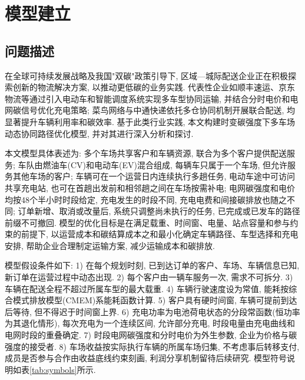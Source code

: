 \documentclass{setp-new}
\begin{document}

\section{模型建立}

\subsection{问题描述}

在全球可持续发展战略及我国"双碳"政策引导下,
区域—城际配送企业正在积极探索创新的物流解决方案, 以推动更低碳的业务实践.
代表性企业如顺丰速运、京东物流等通过引入电动车和智能调度系统实现多车型协同运输,
并结合分时电价和电网碳信号优化充电策略;
菜鸟网络与中通快递依托多仓协同机制开展联合配送, 均显著提升车辆利用率和碳效率.
基于此类行业实践, 本文构建时变碳强度下多车场动态协同路径优化模型, 并对其进行深入分析和探讨.

本文模型具体表述为:
多个车场共享客户和车辆资源, 联合为多个客户提供配送服务;
车队由燃油车(CV)和电动车(EV)混合组成, 每辆车只属于一个车场, 但允许服务其他车场的客户;
车辆可在一个运营日内连续执行多趟任务,
电动车途中可访问共享充电站, 也可在首趟出发前和相邻趟之间在车场按需补电;
电网碳强度和电价均按48个半小时时段给定,
充电发生的时段不同, 充电电费和间接碳排放也随之不同;
订单新增、取消或改量后, 系统只调整尚未执行的任务, 已完成或已发车的路径前缀不可撤回.
模型的优化目标是在满足载重、时间窗、电量、站点容量和参与约束的前提下,
以运营成本和碳结算成本之和最小化确定车辆路径、车型选择和充电安排,
帮助企业合理制定运输方案, 减少运输成本和碳排放.

模型假设条件如下:
1) 在每个规划时刻, 已到达订单的客户、车场、车辆信息已知, 新订单在运营过程中动态出现.
2) 每个客户由一辆车服务一次, 需求不可拆分.
3) 车辆在配送全程不超过所属车型的最大载重.
4) 车辆行驶速度设为常值, 能耗按综合模式排放模型(CMEM)系能耗函数\cite{ref:27,ref:36}计算.
5) 客户具有硬时间窗, 车辆可提前到达后等待, 但不得迟于时间窗上界.
6) 充电功率为电池荷电状态的分段常函数(恒功率为其退化情形),
每次充电为一个连续区间, 允许部分充电, 时段电量由充电曲线和电网时段的重叠确定.
7) 时段电网碳强度和分时电价为外生参数, 企业为价格与碳强度的接受者.
8) 车场收益按实际执行车辆的所属车场归集, 不考虑事后转移支付,
成员是否参与合作由收益底线约束刻画, 利润分享机制留待后续研究.
模型符号说明如表\ref{tab:symbols}所示.
\end{document}

